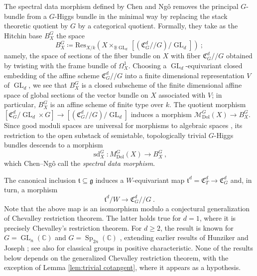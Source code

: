 \documentclass[11pt, a4paper]{amsart}
\theoremstyle{definition}
\theoremstyle{myitemstyle}
\newcommand{\C}{\mathbb{C}}
\newcommand{\Res}{{\mathrm{Res}}}
\newcommand{\mbb}[1]{\mathbb{#1}}
\newcommand{\mc}[1]{{\mathcal{#1}}}
\DeclareMathOperator{\GL}{GL}
\DeclareMathOperator{\Sp}{Sp}
\newcommand{\Dol}{{\mathrm{Dol}}}
\newcommand{\sd}{{\operatorname{sd}}}
\begin{document}
The spectral data morphism defined by Chen and Ng\^o \cite{CN20} removes the principal $G$-bundle from a $G$-Higgs bundle in the minimal way by replacing the stack theoretic quotient by $G$ by a categorical quotient. Formally, they take as the Hitchin base $B^G_X$ the space
\begin{equation}
\label{eq:def of Hitchin base}
    B^G_X\coloneqq \Res_{X/k}(X\times_{\mbb B\GL_d} [(\mathfrak C^d_G/\!\!/G)/\GL_d])\ ;
\end{equation}
namely, the space of sections of the fiber bundle on $X$ with fiber $\mathfrak C^d_G/\!\!/G$ obtained by twisting with the frame bundle of $\Omega_X^1$.
Choosing a $\GL_d$-equivariant closed embedding of the affine scheme $\mathfrak C^d_G/\!\!/G$ into a finite dimensional representation $V$ of $\GL_d$, we see that $B^G_X$ is a closed subscheme of the finite dimensional affine space of global sections of the vector bundle on $X$ associated with $V$; in particular, $B^G_X$ is an affine scheme of finite type over $k$. The quotient morphism $[\mathfrak C^d_G/\GL_d\times G]\to[(\mathfrak C^d_G/\!\!/G)/\GL_d]$ induces a morphism $\mc M^G_\Dol(X)\to B^G_X$. Since good moduli spaces are universal for morphisms to algebraic spaces \cite{Alper13}, its restriction to the open substack of semistable, topologically trivial $G$-Higgs bundles descends to a morphism
\[
\sd^G_X\colon M^G_\Dol(X)\longrightarrow B^G_X\ ,
\]
which Chen--Ng\^o call the \emph{spectral data morphism}.

The canonical inclusion $\mathfrak{t}\subseteq \mathfrak{g}$ induces a $W$-equivariant map $\mathfrak{t}^d=\mathfrak{C}^d_T\to \mathfrak{C}^d_G$ and, in turn, a morphism
\[
    \mathfrak t^d/W \to \mathfrak C^d_G/\!\!/G\ .
\]
Note that the above map is an isomorphism modulo  a conjectural generalization of Chevalley restriction theorem. The latter holds  true for $d=1$, where it is precisely Chevalley's restriction theorem.
For $d\geq 2$, the result is known for $G=\GL_n(\C)$  \cite{CN20} and $G=\Sp_{2n}(\C)$ \cite{CN21}, extending earlier results of Hunziker \cite{H97} and Joseph \cite{J97}; see also \cite{Xia24} for classical groups in positive characteristic. None of the results below depends on the generalized Chevalley restriction theorem, with the exception of Lemma \ref{lem:trivial cotangent}, where it appears as a hypothesis.
\end{document}
